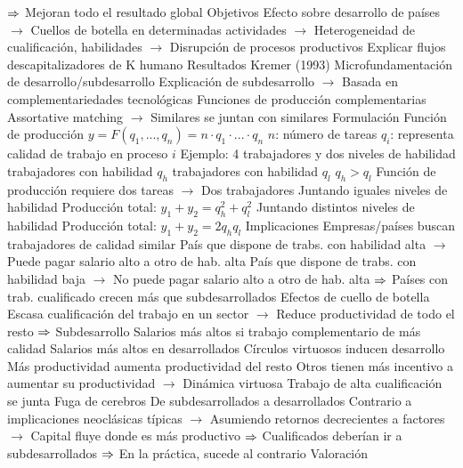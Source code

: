 \documentclass{nuevotema}
\begin{document}
\begin{esquemal}
				\4[] $\Rightarrow$ Mejoran todo el resultado global
				\4 Objetivos
				\4[] Efecto sobre desarrollo de países
				\4[] $\to$ Cuellos de botella en determinadas actividades
				\4[] $\to$ Heterogeneidad de cualificación, habilidades
				\4[] $\to$ Disrupción de procesos productivos
				\4[] Explicar flujos descapitalizadores de K humano
				\4 Resultados
				\4[] Kremer (1993)
				\4[] Microfundamentación de desarrollo/subdesarrollo
				\4[] Explicación de subdesarrollo
				\4[] $\to$ Basada en complementariedades tecnológicas
				\4[] Funciones de producción complementarias
				\4[] Assortative matching
				\4[] $\to$ Similares se juntan con similares
			\3 Formulación
				\4 Función de producción
				\4[] $y=F(q_1, ..., q_n) = n \cdot q_1 \cdot ... \cdot q_n$
				\4[] $n$: número de tareas
				\4[] $q_i$: representa calidad de trabajo en proceso $i$
				\4 Ejemplo: 4 trabajadores y dos niveles de habilidad
				 trabajadores con habilidad $q_h$
				 trabajadores con habilidad $q_l$
				\4[] $q_h > q_l$
				\4[] Función de producción requiere dos tareas
				\4[] $\to$ Dos trabajadores
				\4 Juntando iguales niveles de habilidad
				\4[] Producción total: $y_1 + y_2 = q_h^2 + q_l^2$
				\4 Juntando distintos niveles de habilidad
				\4[] Producción total: $y_1 + y_2 = 2q_h q_l$
			\3 Implicaciones
				\4 Empresas/países buscan trabajadores de calidad similar
				\4[] País que dispone de trabs. con habilidad alta
				\4[] $\to$ Puede pagar salario alto a otro de hab. alta
				\4[] País que dispone de trabs. con habilidad baja
				\4[] $\to$ No puede pagar salario alto a otro de hab. alta
				\4[] $\Rightarrow$ Países con trab. cualificado crecen más que subdesarrollados
				\4 Efectos de cuello de botella
				\4[] Escasa cualificación del trabajo en un sector
				\4[] $\to$ Reduce productividad de todo el resto
				\4[] $\Rightarrow$ Subdesarrollo
				\4 Salarios más altos si trabajo complementario de más calidad
				\4[] Salarios más altos en desarrollados
				\4 Círculos virtuosos inducen desarrollo
				\4[] Más productividad aumenta productividad del resto
				\4[] Otros tienen más incentivo a aumentar su productividad
				\4[] $\to$ Dinámica virtuosa
				\4 Trabajo de alta cualificación se junta
				\4 Fuga de cerebros
				\4[] De subdesarrollados a desarrollados
				\4[] Contrario a implicaciones neoclásicas típicas
				\4[] $\to$ Asumiendo retornos decrecientes a factores
				\4[] $\to$ Capital fluye donde es más productivo
				\4[] $\Rightarrow$ Cualificados deberían ir a subdesarrollados
				\4[] $\Rightarrow$ En la práctica, sucede al contrario
			\3 Valoración

\end{esquemal}
\end{document}
